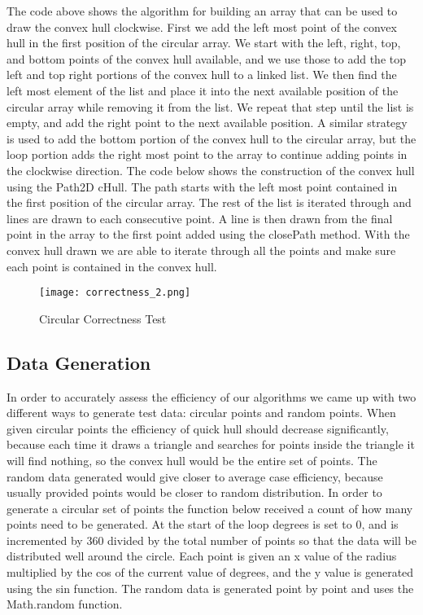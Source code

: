\documentclass[a4paper, 12pt]{article}
\begin{document}
{  The code above shows the algorithm for building an array that can be used to draw the convex hull clockwise. First we add the left most point of the convex hull in the first position of the circular array. We start with the left, right, top, and bottom points of the convex hull available, and we use those to add the top left and top right portions of the convex hull to a linked list. We then find the left most element of the list and place it into the next available position of the circular array while removing it from the list. We repeat that step until the list is empty, and add the right point to the next available position. A similar strategy is used to add the bottom portion of the convex hull to the circular array, but the loop portion adds the right most point to the array to continue adding points in the clockwise direction. The code below shows the construction of the convex hull using the Path2D cHull. The path starts with the left most point contained in the first position of the circular array. The rest of the list is iterated through and lines are drawn to each consecutive point. A line is then drawn from the final point in the array to the first point added using the closePath method. With the convex hull drawn we are able to iterate through all the points and make sure each point is contained in the convex hull.
  \begin{figure}[H]
    \texttt{[image: correctness\_2.png]}
    \caption{Circular Correctness Test}
    \label{fig:correctness_2}
  \end{figure} 

  \subsection{Data Generation}
  In order to accurately assess the efficiency of our algorithms we came up with two different ways to generate test data: circular points and random points. When given circular points the efficiency of quick hull should decrease significantly, because each time it draws a triangle and searches for points inside the triangle it will find nothing, so the convex hull would be the entire set of points. The random data generated would give closer to average case efficiency, because usually provided points would be closer to random distribution. In order to generate a circular set of points the function below received a count of how many points need to be generated. At the start of the loop degrees is set to 0, and is incremented by 360 divided by the total number of points so that the data will be distributed well around the circle. Each point is given an x value of the radius multiplied by the cos of the current value of degrees, and the y value is generated using the sin function. The random data is generated point by point and uses the Math.random function.

}
\end{document}
